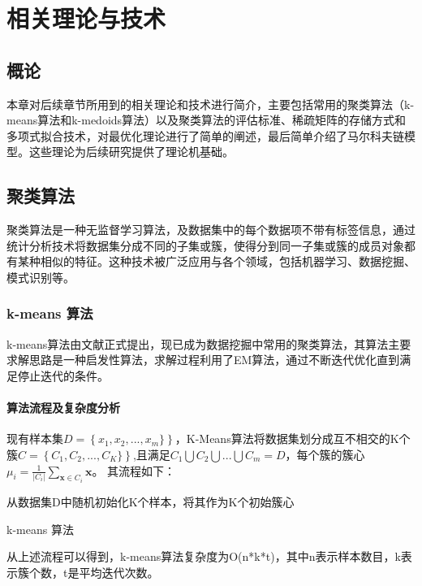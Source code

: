 \chapter{相关理论与技术}

\section{概论}

本章对后续章节所用到的相关理论和技术进行简介，主要包括常用的聚类算法（k-means算法和k-medoids算法）以及聚类算法的评估标准、稀疏矩阵的存储方式和多项式拟合技术，对最优化理论进行了简单的阐述，最后简单介绍了马尔科夫链模型。这些理论为后续研究提供了理论机基础。

\section{聚类算法}
聚类算法是一种无监督学习算法，及数据集中的每个数据项不带有标签信息，通过统计分析技术将数据集分成不同的子集或簇，使得分到同一子集或簇的成员对象都有某种相似的特征。这种技术被广泛应用与各个领域，包括机器学习、数据挖掘、模式识别等。

\subsection{k-means 算法}

k-means算法由文献\cite{hartigan1979algorithm}正式提出，现已成为数据挖掘中常用的聚类算法，其算法主要求解思路是一种启发性算法，求解过程利用了EM算法，通过不断迭代优化直到满足停止迭代的条件。

\subsubsection{算法流程及复杂度分析}

现有样本集$D=\left\{x_1,x_2,...,x_m\}\right\}$，K-Means算法将数据集划分成互不相交的K个簇$C=\left\{C_1,C_2,...,C_K\}\right\}$,且满足$C_1\bigcup{C_2\bigcup{...\bigcup{C_m=D}}}$，每个簇的簇心$\mu _i=\frac{1}{|C_i|}\sum_{\mathbf{x}\in C_i}{\mathbf{x}}$。
其流程如下：\\
\begin{algorithm}[H]
	\label{kmeans}
	 从数据集D中随机初始化K个样本，将其作为K个初始簇心\;
	 \caption{k-means 算法}
\end{algorithm}
从上述流程可以得到，k-means算法复杂度为O(n*k*t)，其中n表示样本数目，k表示簇个数，t是平均迭代次数。


